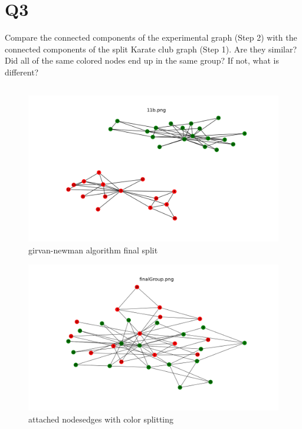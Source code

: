 \documentclass[12pt]{article}
\begin{document}
\section*{Q3}
Compare the connected components of the experimental graph (Step 2) with the connected components of the split Karate club graph (Step 1). Are they similar? Did all of the same colored nodes end up in the same group? If not, what is different?
\subsection*{\color{blue}{Answer}}
\begin{figure}[H]
\centering
\includegraphics[trim=0 0 0 0, clip, width=\textwidth] {11b.png}
\caption{girvan-newman algorithm final split }
\label{fig:q3a}
\end{figure}

\begin{figure}[H]
\centering
\includegraphics[trim=0 0 0 0, clip, width=\textwidth] {finalGroup.png}
\caption{attached nodesedges with color splitting }
\label{fig:q111b}
\end{figure}
\end{document}
